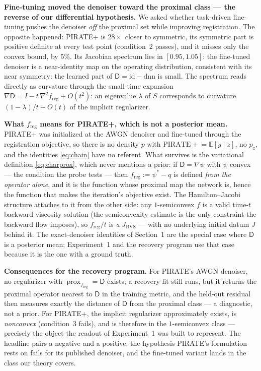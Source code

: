 \documentclass[11pt]{article}
\newcommand{\D}{\mathsf{D}}
\newcommand{\prox}{\operatorname{prox}}
\newcommand{\freg}{f_{\mathrm{reg}}}
\newcommand{\Jbvs}{J_{\mathrm{BVS}}}
\begin{document}
\textbf{Fine-tuning moved the denoiser toward the proximal class --- the reverse of our differential hypothesis.} We asked whether task-driven fine-tuning pushes the denoiser \emph{off} the proximal set while improving registration. The opposite happened: PIRATE+ is $28\times$ closer to symmetric, its symmetric part is positive definite at every test point (condition~2 passes), and it misses only the convex bound, by $5\%$. Its Jacobian spectrum lies in $[0.95, 1.05]$: the fine-tuned denoiser is a near-identity map on the operating distribution, consistent with its near symmetry: the learned part of $\D = \mathrm{id} - \mathrm{dnn}$ is small. The spectrum reads directly as curvature through the small-time expansion $\nabla\D = I - t\,\nabla^2\freg + O(t^2)$: an eigenvalue $\lambda$ of $S$ corresponds to curvature $(1-\lambda)/t + O(t)$ of the implicit regularizer.

\textbf{What $\freg$ means for PIRATE+, which is not a posterior mean.} PIRATE+ was initialized at the AWGN denoiser and fine-tuned through the registration objective, so there is no density $p$ with $\mathrm{PIRATE+} = \mathbb E[y \mid z]$, no $p_z$, and the identities \eqref{eq:chain} have no referent. What survives is the variational definition \eqref{eq:charprox}, which never mentions a prior: if $\D = \nabla\psi$ with $\psi$ convex --- the condition the probe tests --- then $\freg := \psi^* - q$ is defined \emph{from the operator alone}, and it is the function whose proximal map the network is, hence the function that makes the iteration's objective exist. The Hamilton--Jacobi structure attaches to it from the other side: any $1$-semiconvex $f$ is a valid time-$t$ backward viscosity solution (the semiconvexity estimate is the only constraint the backward flow imposes), so $\freg/t$ is \emph{a} $\Jbvs$ --- with no underlying initial datum $J$ behind it. The exact-denoiser identities of Section~1 are the special case where $\D$ is a posterior mean; Experiment~1 and the recovery program use that case because it is the one with a ground truth.

\textbf{Consequences for the recovery program.} For PIRATE's AWGN denoiser, no regularizer with $\prox_{\freg} = \D$ exists; a recovery fit still runs, but it returns the proximal operator nearest to $\D$ in the training metric, and the held-out residual then measures exactly the distance of $\D$ from the proximal class --- a diagnostic, not a prior. For PIRATE+, the implicit regularizer approximately exists, is \emph{nonconvex} (condition~3 fails), and is therefore in the $1$-semiconvex class --- precisely the object the readout of Experiment~1 was built to represent. The headline pairs a negative and a positive: the hypothesis PIRATE's formulation rests on fails for its published denoiser, and the fine-tuned variant lands in the class our theory covers.
\end{document}
